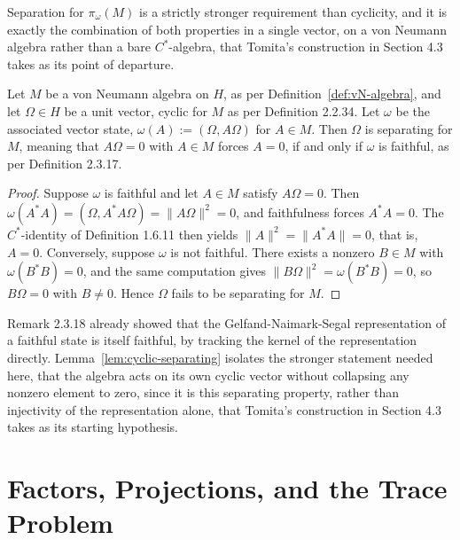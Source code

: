 Separation for $\pi_\omega(M)$ is a strictly stronger requirement than
cyclicity, and it is exactly the combination of both properties in a
single vector, on a von Neumann algebra rather than a bare
$C^*$-algebra, that Tomita's construction in Section 4.3 takes as its
point of departure.

\begin{lemma}\label{lem:cyclic-separating}
	Let $M$ be a von Neumann algebra on $H$, as per
	Definition~\ref{def:vN-algebra}, and let $\Omega \in H$ be a unit
	vector, cyclic for $M$ as per Definition 2.2.34. Let $\omega$ be the
	associated vector state, $\omega(A) := (\Omega, A\Omega)$ for
	$A \in M$. Then $\Omega$ is separating for $M$, meaning that
	$A\Omega = 0$ with $A \in M$ forces $A = 0$, if and only if $\omega$ is
	faithful, as per Definition 2.3.17.
\end{lemma}

\begin{proof}
	Suppose $\omega$ is faithful and let $A \in M$ satisfy $A\Omega = 0$.
	Then $\omega(A^*A) = (\Omega, A^*A\Omega) = \lVert A\Omega \rVert^2 =
	0$, and faithfulness forces $A^*A = 0$. The $C^*$-identity of
	Definition 1.6.11 then yields $\lVert A \rVert^2 = \lVert A^*A \rVert =
	0$, that is, $A = 0$. Conversely, suppose $\omega$ is not faithful.
	There exists a nonzero $B \in M$ with $\omega(B^*B) = 0$, and the same
	computation gives $\lVert B\Omega \rVert^2 = \omega(B^*B) = 0$, so
	$B\Omega = 0$ with $B \neq 0$. Hence $\Omega$ fails to be separating
	for $M$.
\end{proof}

Remark 2.3.18 already showed that the Gelfand-Naimark-Segal
representation of a faithful state is itself faithful, by tracking the
kernel of the representation directly.
Lemma~\ref{lem:cyclic-separating} isolates the stronger statement
needed here, that the algebra acts on its own cyclic vector without
collapsing any nonzero element to zero, since it is this separating
property, rather than injectivity of the representation alone, that
Tomita's construction in Section 4.3 takes as its starting hypothesis.

\section{Factors, Projections, and the Trace Problem}\label{sec:factors}

